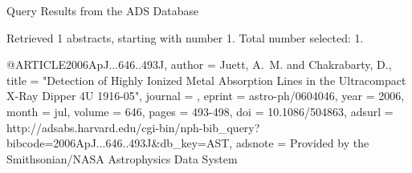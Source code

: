 Query Results from the ADS Database


Retrieved 1 abstracts, starting with number 1.  Total number selected: 1.

@ARTICLE{2006ApJ...646..493J,
   author = {{Juett}, A.~M. and {Chakrabarty}, D.},
    title = "{Detection of Highly Ionized Metal Absorption Lines in the Ultracompact X-Ray Dipper 4U 1916-05}",
  journal = {\apj},
   eprint = {astro-ph/0604046},
     year = 2006,
    month = jul,
   volume = 646,
    pages = {493-498},
      doi = {10.1086/504863},
   adsurl = {http://adsabs.harvard.edu/cgi-bin/nph-bib_query?bibcode=2006ApJ...646..493J&db_key=AST},
  adsnote = {Provided by the Smithsonian/NASA Astrophysics Data System}
}


